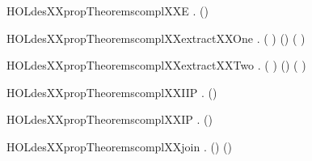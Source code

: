 \newcommand{\HOLdesXXpropTheoremscharapairDESXXind}{\UseVerbatim{HOLdesXXpropTheoremscharapairDESXXind}}
\begin{SaveVerbatim}{HOLdesXXpropTheoremscomplXXE}
\HOLTokenTurnstile{} \HOLSymConst{\HOLTokenForall{}}.  (\HOLSymConst{\HOLTokenNeg{}}) \HOLSymConst{=} \HOLSymConst{\HOLTokenNeg{}} 
\end{SaveVerbatim}
\newcommand{\HOLdesXXpropTheoremscomplXXE}{\UseVerbatim{HOLdesXXpropTheoremscomplXXE}}
\begin{SaveVerbatim}{HOLdesXXpropTheoremscomplXXextractXXOne}
\HOLTokenTurnstile{} \HOLSymConst{\HOLTokenForall{}}. ( \HOLSymConst{\HOLTokenExtract{}} ) (\HOLSymConst{\HOLTokenNeg{}}) \HOLSymConst{=} \HOLSymConst{\HOLTokenNeg{}}( \HOLSymConst{\HOLTokenExtract{}} ) 
\end{SaveVerbatim}
\newcommand{\HOLdesXXpropTheoremscomplXXextractXXOne}{\UseVerbatim{HOLdesXXpropTheoremscomplXXextractXXOne}}
\begin{SaveVerbatim}{HOLdesXXpropTheoremscomplXXextractXXTwo}
\HOLTokenTurnstile{} \HOLSymConst{\HOLTokenForall{}}. ( \HOLSymConst{\HOLTokenExtract{}} ) (\HOLSymConst{\HOLTokenNeg{}}) \HOLSymConst{=} \HOLSymConst{\HOLTokenNeg{}}( \HOLSymConst{\HOLTokenExtract{}} ) 
\end{SaveVerbatim}
\newcommand{\HOLdesXXpropTheoremscomplXXextractXXTwo}{\UseVerbatim{HOLdesXXpropTheoremscomplXXextractXXTwo}}
\begin{SaveVerbatim}{HOLdesXXpropTheoremscomplXXIIP}
\HOLTokenTurnstile{} \HOLSymConst{\HOLTokenForall{}}.  (\HOLSymConst{\HOLTokenNeg{}}) \HOLSymConst{=} \HOLSymConst{\HOLTokenNeg{}} 
\end{SaveVerbatim}
\newcommand{\HOLdesXXpropTheoremscomplXXIIP}{\UseVerbatim{HOLdesXXpropTheoremscomplXXIIP}}
\begin{SaveVerbatim}{HOLdesXXpropTheoremscomplXXIP}
\HOLTokenTurnstile{} \HOLSymConst{\HOLTokenForall{}}.  (\HOLSymConst{\HOLTokenNeg{}}) \HOLSymConst{=} \HOLSymConst{\HOLTokenNeg{}} 
\end{SaveVerbatim}
\newcommand{\HOLdesXXpropTheoremscomplXXIP}{\UseVerbatim{HOLdesXXpropTheoremscomplXXIP}}
\begin{SaveVerbatim}{HOLdesXXpropTheoremscomplXXjoin}
\HOLTokenTurnstile{} \HOLSymConst{\HOLTokenForall{}} .  (\HOLSymConst{\HOLTokenNeg{}}\HOLSymConst{,}\HOLSymConst{\HOLTokenNeg{}}) \HOLSymConst{=} \HOLSymConst{\HOLTokenNeg{}} (\HOLSymConst{,})
\end{SaveVerbatim}
